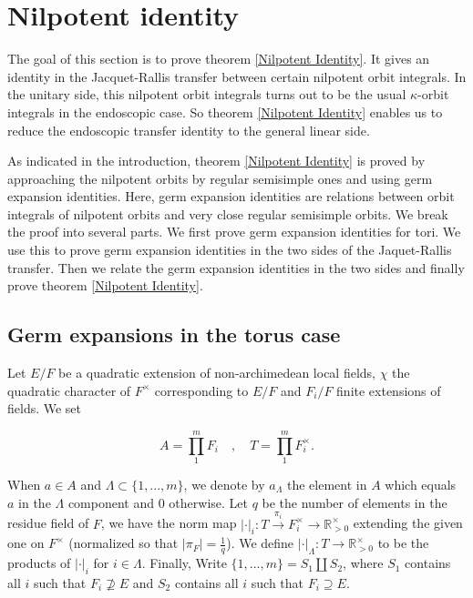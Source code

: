 \documentclass[11pt, oneside,reqno]{amsart}   	%
\begin{document}
\section{Nilpotent identity} \label{Nil}
The goal of this section is to prove theorem \ref{Nilpotent Identity}. It gives an identity in the Jacquet-Rallis transfer between certain nilpotent orbit integrals. In the unitary side, this nilpotent orbit integrals turns out to be the usual $\kappa$-orbit integrals in the endoscopic case. So theorem \ref{Nilpotent Identity} enables us to reduce the endoscopic transfer identity to the general linear side. 

As indicated in the introduction, theorem \ref{Nilpotent Identity} is proved by approaching the nilpotent orbits by regular semisimple ones and using germ expansion identities. Here, germ expansion identities are relations between orbit integrals of nilpotent orbits and very close regular semisimple orbits. We break the proof into several parts. We first prove germ expansion identities for tori. We use this to prove germ expansion identities in the two sides of the Jaquet-Rallis transfer. Then we relate the germ expansion identities in the two sides and finally prove theorem \ref{Nilpotent Identity}.

\subsection{Germ expansions in the torus case} \label{A lemma}


Let $E/F$ be a quadratic extension of non-archimedean local fields, $\chi$ the quadratic character of $F^\times$ corresponding to $E/F$ and $F_i/F$ finite extensions of fields.  We set

$$A=\prod_1^m F_i\quad,\quad T=\prod_1^m F_i^\times.$$ 




When $a \in A$ and $\Lambda \subset \{1,...,m\}$, we denote by $a_\Lambda$ the element in $A$ which equals $a$ in the $\Lambda$ component and 0 otherwise. Let $q$ be the number of elements in the residue field of $F$, we have the norm map $|\cdot|_{i}: T \xrightarrow{\pi_i} F_i^\times \rightarrow \mathbb{R}^\times_{>0}$ extending the given one on $F^\times$ (normalized so that $|\pi_F|=\frac{1}{q}$). We define $|\cdot|_\Lambda: T \rightarrow \mathbb{R}^\times_{>0}$ to be the products of $|\cdot|_{i}$ for $i \in \Lambda$. Finally, Write $\{1,...,m\}=S_1 \amalg S_2$, where $S_1$ contains all $i$ such that $F_i \nsupseteq E$ and $S_2$ contains all $i$ such that $F_i \supseteq E$. 
\end{document}
